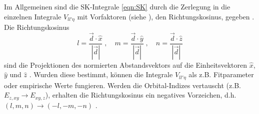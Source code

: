 Im Allgemeinen sind die SK-Integrale \eqref{eqn:SK} durch die Zerlegung in die einzelnen Integrale $V_{ll'\eta}$ mit Vorfaktoren (siehe \cite{PhysRev.94.1498}),
den Richtungskosinus, gegeben \cite{SC_literature}.
Die Richtungskosinus 
\begin{equation}
    l = \frac{\vec{d} \cdot \hat{x}}{\left | \vec{d} \right |} \; , \quad
    m = \frac{\vec{d} \cdot \hat{y}}{\left | \vec{d} \right |} \; , \quad
    n = \frac{\vec{d} \cdot \hat{z}}{\left | \vec{d} \right |} \label{eqn:RK}
\end{equation}
sind die Projektionen des normierten Abstandsvektors auf die Einheitsvektoren $\hat{x}$, $\hat{y}$ und $\hat{z}$ \cite{SC_literature}.
Wurden diese bestimmt, können die Integrale $V_{ll'\eta}$ als z.B. Fitparameter oder empirische Werte fungieren. 
Werden die Orbital-Indizes vertauscht (z.B. $E_{z,xy} \to E_{xy, z}$), erhalten die Richtungskosinus ein negatives Vorzeichen, d.h. $(l,m,n) \to (-l,-m,-n)$ \cite{PhysRev.94.1498}.